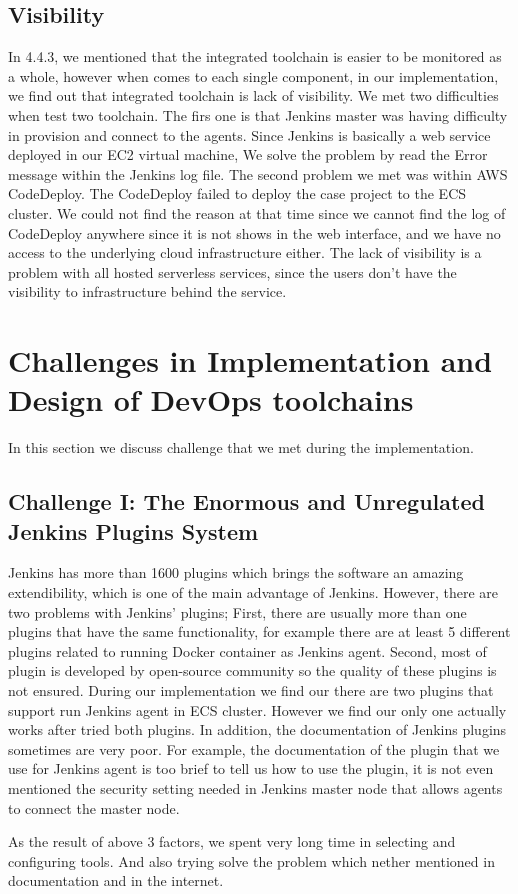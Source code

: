 \subsection{Visibility}
\label{visibility}
In 4.4.3, we mentioned that the integrated toolchain is easier to be monitored as a whole, however when comes to each single component, in our implementation, we find out that integrated toolchain is lack of visibility. We met two difficulties when test two toolchain. The firs one is that Jenkins master was having difficulty in provision and connect to the agents. Since Jenkins is basically a web service deployed in our EC2 virtual machine, We solve the problem by read the Error message within the Jenkins log file. The second problem we met was within AWS CodeDeploy. The CodeDeploy failed to deploy the case project to the ECS cluster. We could not find the reason at that time since we cannot find the log of CodeDeploy anywhere since it is not shows in the web interface, and we have no access to the underlying cloud infrastructure either. The lack of visibility is a problem with all hosted serverless services, since the users don't have the visibility to infrastructure behind the service.

\section{Challenges in Implementation and Design of DevOps toolchains}
In this section we discuss challenge that we met during the implementation. 
\subsection{Challenge I: The Enormous and Unregulated Jenkins Plugins System}
Jenkins has more than 1600 plugins which brings the software an amazing extendibility, which is one of the main advantage of Jenkins. However, there are two problems with Jenkins' plugins; First, there are usually more than one plugins that have the same functionality, for example there are at least 5 different plugins related to running Docker container as Jenkins agent. Second, most of plugin is developed by open-source community so the quality of these plugins is not ensured. During our implementation we find our there are two plugins that support run Jenkins agent in ECS cluster. However we find our only one actually works after tried both plugins. In addition, the documentation of Jenkins plugins sometimes are very poor. For example, the documentation of the plugin that we use for Jenkins agent is too brief to tell us how to use the plugin, it is not even mentioned the security setting needed in Jenkins master node that allows agents to connect the master node. 
\par
As the result of above 3 factors, we spent very long time in selecting and configuring tools. And also trying solve the problem which nether mentioned in documentation and in the internet. 
